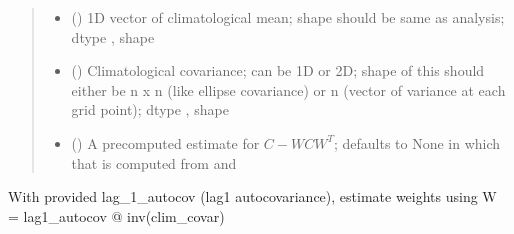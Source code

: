 \documentclass[letterpaper,10pt,english]{sphinxmanual}
\begin{document}
\begin{fulllineitems}
\begin{quote}
\begin{description}
\begin{itemize}
\item {}
\sphinxAtStartPar
{} () \textendash{} 1D vector of climatological mean;
shape should be same as analysis;
dtype , shape 

\item {}
\sphinxAtStartPar
{} () \textendash{} Climatological covariance; can be 1D or 2D;
shape of this should either be n x n (like ellipse covariance)
or n (vector of variance at each grid point);
dtype , shape 

\item {}
\sphinxAtStartPar
{} () \textendash{} A precomputed estimate for \(C - W C W^{T}\);
defaults to None in which that is computed from
 and 

\end{itemize}

\end{description}\end{quote}

\begin{fulllineitems}
\label{\detokenize{kalman:glomar_gridding.autoregressive_kalman.Autoregressive1ForecastVector.from_autocov}}
\pysigstartsignatures
\pysiglinewithargsret
{}
{\sphinxparamcomma {}\sphinxparamcomma {}\sphinxparamcomma {}\sphinxparamcomma {}\sphinxparamcomma {}\sphinxparamcomma {}}
{}
\pysigstopsignatures
\sphinxAtStartPar
With provided lag\_1\_autocov (lag\sphinxhyphen{}1 autocovariance),
estimate weights using W = lag1\_autocov @ inv(clim\_covar)


\end{fulllineitems}
\end{fulllineitems}
\end{document}
